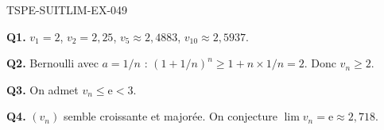 \begin{corrige}{TSPE-SUITLIM-EX-049}

\textbf{Q1.} $v_1=2$, $v_2=2{,}25$, $v_5 \approx 2{,}4883$, $v_{10} \approx 2{,}5937$.

\textbf{Q2.} Bernoulli avec $a=1/n$ : $(1+1/n)^n \geq 1+n \times 1/n = 2$. Donc $v_n \geq 2$.

\textbf{Q3.} On admet $v_n \leq \mathrm{e} < 3$.

\textbf{Q4.} $(v_n)$ semble croissante et majorée. On conjecture $\lim v_n = \mathrm{e} \approx 2{,}718$.

\end{corrige}
